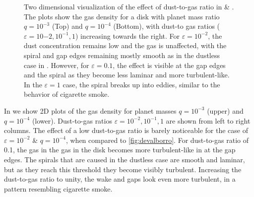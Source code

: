 \documentclass[onecolumn]{report}
\newcommand{\epsi}{\varepsilon}
\begin{document}
\begin{figure}
  \begin{center}
  \end{center}
  \caption{Two dimensional visualization of the effect of dust-to-gas ratio in  \& . The plots show the gas density for a disk with 	    planet mass ratio $q=10^{-3}$ (Top) and $q=10^{-4}$ (Bottom), with dust-to gas ratios ($\epsi=10{-2}, 10^{-1}, 1$) increasing towards the right. For $\epsi=10^{-2}$, the dust concentration remains low and the gas is unaffected, with the spiral and gap edges remaining mostly smooth as in the dustless case in . However, for $\epsi=0.1$, the effect is visible at the gap edges and the spiral as they become less laminar and more turbulent-like. In the $\epsi=1$ case, the spiral breaks up into eddies, similar to the behavior of cigarette smoke.}
  \label{fig:jupnepd2g}
\end{figure}


In  we show 2D plots of the gas density for planet masses $q=10^{-3}$ (upper) and $q=10^{-4}$ (lower). Dust-to-gas ratios $\varepsilon=10^{-2}, 10^{-1}, 1$ are shown from left to right columns. The effect of a low dust-to-gas ratio is barely noticeable for the case of $\varepsilon=10^{-2}$ \& $q=10^{-4}$, when compared to \ref{fig:devalborro}. For dust-to-gas ratio of 0.1, the gas in the gas in the disk becomes more turbulent-like in at the gap edges. The spirals that are caused in the dustless case are smooth and laminar, but as they reach this threshold they become visibly turbulent. Increasing the dust-to-gas ratio to unity, the wake and gaps look even more turbulent, in a pattern resembling cigarette smoke.
\end{document}
